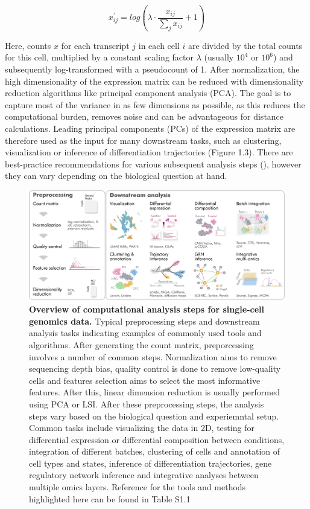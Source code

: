 \[ x^{\prime}_{ij} = log(\lambda \cdot  \frac{x_{ij}}{\sum_{j}{x_{ij}}} + 1)  \]

Here, counts $x$ for each transcript $j$ in each cell $i$ are divided by the total counts for this cell, multiplied by a constant scaling factor $\lambda$ (usually $10^4$ or $10^6$) and subsequently log-transformed with a pseudocount of 1. After normalization, the high dimensionality of the expression matrix can be reduced with dimensionality reduction algorithms like principal component analysis (PCA). The goal is to capture most of the variance in as few dimensions as possible, as this reduces the computational burden, removes noise and can be advantageous for distance calculations. Leading principal components (PCs) of the expression matrix are therefore used as the input for many downstream tasks, such as clustering, visualization or inference of differentiation trajectories (Figure 1.3). There are best-practice recommendations for various subsequent analysis steps (\cite{luecken_current_2019}), however they can vary depending on the biological question at hand.

\begin{figure}[t!]
  \centering
  \includegraphics[width=\textwidth]{figures/introduction/Figure_comp}
  \caption{\textbf{Overview of computational analysis steps for single-cell genomics data.} 
  Typical preprocessing steps and downstream analysis tasks indicating examples of commonly used tools and algorithms. After generating the count matrix, preporcessing involves a number of common steps. Normalization aims to remove sequencing depth bias, quality control is done to remove low-quality cells and features selection aims to select the most informative features. After this, linear dimension reduction is usually performed using PCA or LSI. After these preprocessing steps, the analysis steps vary based on the biological question and experiemntal setup. Common tasks include visualizing the data in 2D, testing for differential expression or differential composition between conditions, integration of different batches, clustering of cells and annotation of cell types and states, inference of differentiation trajectories, gene regulatory network inference and integrative analyses between multiple omics layers. Reference for the tools and methods highlighted here can be found in Table S1.1}
  \label{fig:intro2}
\end{figure}

